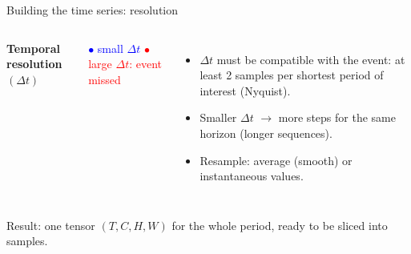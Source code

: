 \documentclass{beamer}
\begin{document}
\begin{frame}{Building the time series: resolution}
\begin{columns}[t]
        \centering
        \textbf{Temporal resolution} $(\Delta t)$

        \vspace{0.1cm}

        {\tiny \textcolor{blue}{$\bullet$ small $\Delta t$} \quad \textcolor{red}{$\bullet$ large $\Delta t$: event missed}}

        \raggedright
        \scriptsize
        \begin{itemize}
            \item $\Delta t$ must be compatible with the event: at least 2 samples per shortest period of interest (Nyquist).
            \item Smaller $\Delta t$ $\rightarrow$ more steps for the same horizon (longer sequences).
            \item Resample: average (smooth) or instantaneous values.
        \end{itemize}
    \end{columns}

    \vfill
    {\footnotesize Result: one tensor $(T, C, H, W)$ for the whole period, ready to be sliced into samples.}
\end{frame}
\end{document}
